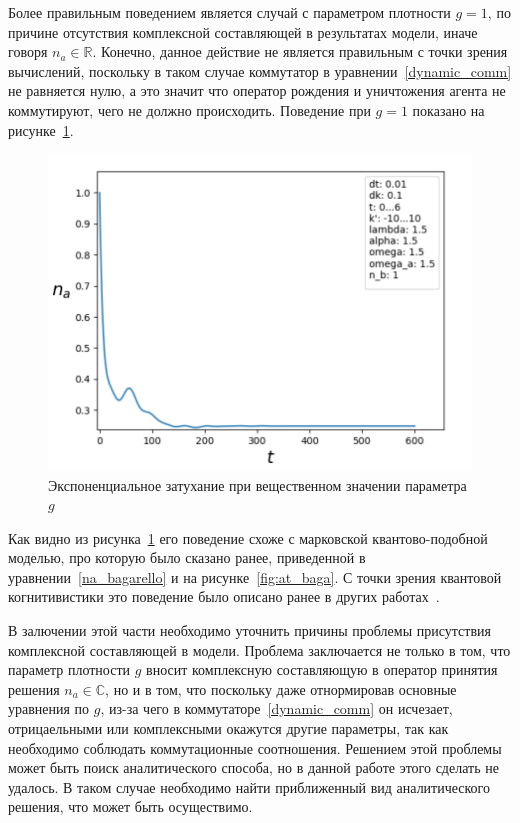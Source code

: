 Более правильным поведением является случай с параметром плотности $g = 1$, по причине отсутствия
комплексной составляющей в результатах модели, иначе говоря $n_{a} \in \mathbb{R}$.
Конечно, данное действие не является правильным с точки зрения вычислений, поскольку в таком случае
коммутатор в уравнении~\eqref{dynamic_comm} не равняется нулю, а это значит что оператор рождения и
уничтожения агента не коммутируют, чего не должно происходить.
Поведение при $g = 1$ показано на рисунке~\ref{fig:fr_real_g_15}.
\begin{figure}[h!]
    \centering
    \captionsetup{justification=centering}
    \includegraphics[width=0.7\linewidth]{pictures/result_first_4.png}
    \caption{Экспоненциальное затухание при вещественном значении параметра $g$}
    \label{fig:fr_real_g_15}
\end{figure}
Как видно из рисунка~\ref{fig:fr_real_g_15} его поведение схоже с марковской квантово-подобной моделью,
про которую было сказано ранее, приведенной в уравнении~\eqref{na_bagarello} и на рисунке~\ref{fig:at_baga}.
С точки зрения квантовой когнитивистики это поведение было описано ранее в других
работах~\citep{bagarello2015quantum,bagarello2018quantum}.

В залючении этой части необходимо уточнить причины проблемы присутствия комплексной составляющей в модели.
Проблема заключается не только в том, что параметр плотности $g$ вносит комплексную составляющую в оператор
принятия решения $n_{a} \in \mathbb{C}$, но и в том, что поскольку даже отнормировав основные уравнения
по $g$, из-за чего в коммутаторе~\eqref{dynamic_comm} он исчезает, отрицаельными или комплексными окажутся
другие параметры, так как необходимо соблюдать коммутационные соотношения.
Решением этой проблемы может быть поиск аналитического способа, но в данной работе этого сделать не удалось.
В таком случае необходимо найти приближенный вид аналитического решения, что может быть осуществимо.

